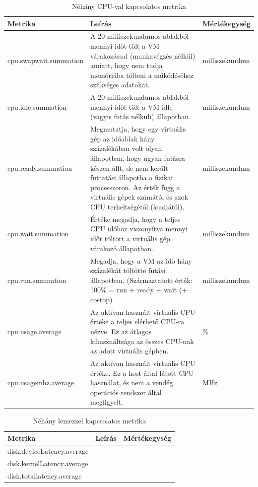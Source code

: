 \documentclass[a4paper,10pt,titlepage]{article}
\begin{document}
\begin{table}[h]
	\caption{Néhány CPU-val kapcsolatos metrika}
	\centering
	\small
	\begin{tabular}{| p{3.5cm} | p{7.5cm} | p{2cm} |}
		\hline
		\rowcolor{tc_bone} \textbf{Metrika} & \textbf{Leírás} & \textbf{Mértékegység} \\
		\hline
		cpu.swapwait.summation & A 20 milliszekundumos ablakból mennyi időt tölt a VM várakozással (munkavégzés nélkül) amiatt, hogy nem tudja memóriába tölteni a működéséhez szükséges adatokat. & milliszekundum \\ 
		\hline
		cpu.idle.summation & A 20 milliszekundumos ablakból mennyi időt tölt a VM idle (vagyis futás nélküli) állapotban. & milliszekundum \\ 
		\hline
		cpu.ready.summation & Megmutatja, hogy egy virtuális gép az időablak hány százalékában volt olyan állapotban, hogy ugyan futásra készen állt, de nem került futtatási állapotba a fizikai processzoron. Az érték függ a virtuális gépek számától és azok CPU terheltségétől (loadjától). & milliszekundum \\ 
		\hline
		cpu.wait.summation & Értéke megadja, hogy a teljes CPU időhöz viszonyítva mennyi időt töltött a virtuális gép várakozó állapotban. & milliszekundum \\ 
		\hline
		cpu.run.summation & Megadja, hogy a VM az idő hány százalékát töltötte futási állapotban. (Származtatott érték: 100\% = run + ready + wait (+ costop) & milliszekundum \\ 
		\hline
		cpu.usage.average & Az aktívan használt virtuális CPU értéke a teljes elérhető CPU-ra nézve. Ez az átlagos kihasználtsága az összes CPU-nak az adott virtuális gépben. & \% \\ 
		\hline
		cpu.usagemhz.average & Az aktívan használt virtuális CPU értéke. Ez a host által látott CPU használat, és nem a vendég operációs rendszer által megfigyelt. & MHz \\ 
		\hline
	\end{tabular}
	\normalsize
	\label{tab:cpu.metrics}
\end{table}

\begin{table}[h]
	\caption{Néhány lemezzel kapcsolatos metrika}
	\centering
	\small
	\begin{tabular}{| p{3.5cm} | p{7.5cm} | p{2cm} |}
		\hline
		\rowcolor{tc_bone} \textbf{Metrika} & \textbf{Leírás} & \textbf{Mértékegység} \\
		\hline
		disk.deviceLatency.average &  & \\ 
		\hline
		disk.kernelLatency.average & & \\ 
		\hline
		disk.totallatency.average & & \\ 
		\hline
	\end{tabular}
	\normalsize
	\label{tab:disk.totallatency.average}
\end{table}
\end{document}
